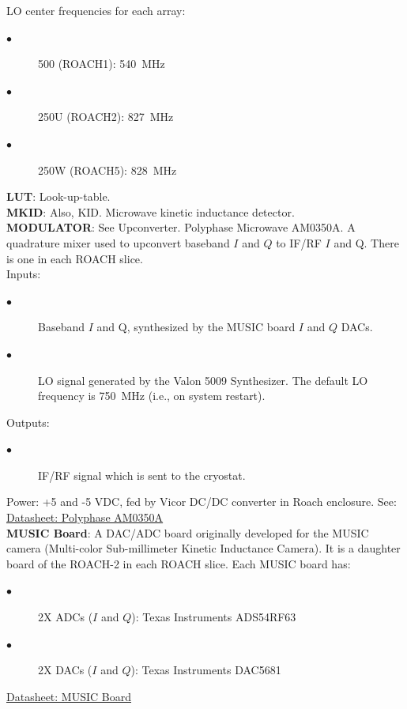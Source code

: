 LO center frequencies for each array:
\begin{description}
  \item[$\bullet$] 500 (ROACH1): 540~MHz
  \item[$\bullet$] 250U (ROACH2): 827~MHz
  \item[$\bullet$] 250W (ROACH5): 828~MHz
\end{description}
\textbf{LUT}: Look-up-table.\\
\textbf{MKID}: Also, KID\@. Microwave kinetic inductance detector.\\
\textbf{MODULATOR}: See Upconverter. Polyphase Microwave AM0350A. A quadrature mixer used to upconvert baseband $I$ and $Q$ to IF/RF $I$ and Q. There is one in each ROACH slice.\\
Inputs:
\begin{description}
  \item[$\bullet$] Baseband $I$ and Q, synthesized by the MUSIC board $I$ and $Q$ DACs.
  \item[$\bullet$] LO signal generated by the Valon 5009 Synthesizer. The default LO frequency is 750~MHz (i.e., on system restart).
\end{description}
Outputs:
\begin{description}
  \item[$\bullet$ ]IF/RF signal which is sent to the cryostat.
\end{description}
Power: +5 and -5 VDC, fed by Vicor DC/DC converter in Roach enclosure.
See: \href{https://polyphasemicrowave.com/media/AM0350A_RevA.pdf}{Datasheet: Polyphase AM0350A}\\
\textbf{MUSIC Board}: A DAC/ADC board originally developed for the MUSIC camera (Multi-color Sub-millimeter Kinetic Inductance Camera). It is a daughter board of the ROACH-2 in each ROACH slice. Each MUSIC board has:
\begin{description}
  \item[$\bullet$] 2X ADCs ($I$ and $Q$): Texas Instruments ADS54RF63
  \item[$\bullet$] 2X DACs ($I$ and $Q$): Texas Instruments DAC5681
\end{description}
\href{https://www.techneinstruments.com/boards-for-roach}{Datasheet: MUSIC Board}\\
